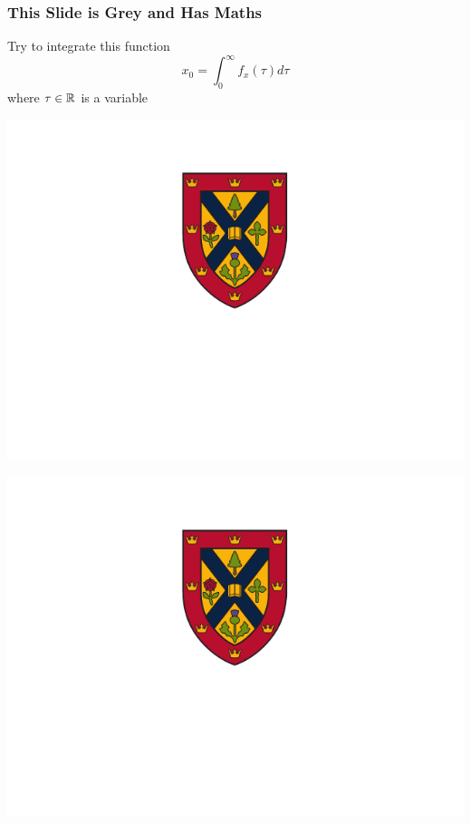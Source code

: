 \documentclass[fleqn]{qu-slides}
\begin{document}

\SlideGrey
\begin{frame}
    \frametitle{This Slide is Grey and Has Maths}
    Try to integrate this function
    \begin{equation*}
        x_0=\int_0^\infty f_x(\tau)d\tau
    \end{equation*}
    where $\tau\in\mathbb R$ is a variable
\end{frame}


\SlideBlue 
\begin{frame}[plain]
    \centering
    \includegraphics[height=0.9\textheight]{logo/qu-logo-vertical-reverse.pdf}
\end{frame}


\SlideRed
\begin{frame}[plain]
    \centering
    \includegraphics[height=0.9\textheight]{logo/qu-logo-vertical-reverse.pdf}
\end{frame}
\end{document}
